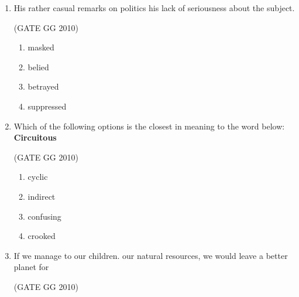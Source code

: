 \documentclass[journal]{IEEEtran}
\begin{document}
\begin{enumerate}[start=26]
\begin{multicols}{4}
\begin{enumerate}
    \item ${E_z=\frac{-1}{i\omega t}\frac{\partial{H_z}}{\partial z}}$
    \vspace{0.3cm}
    \item ${H_x=\frac{-1}{i\omega t}\frac{\partial{E_z}}{\partial z}}$
      \vspace{0.3cm}
    \item ${H_x=\frac{-1}{i\omega t}\frac{\partial{E_x}}{\partial z}}$
      \vspace{0.3cm}
    \item ${H_z=\frac{-1}{i\omega t}\frac{\partial{E_x}}{\partial z}}$\\
    \vspace{0.5cm}
    
\end{enumerate}
\end{multicols}
\textbf{END OF SECTION 2 OF PART B}
\vspace{3cm}

\textbf{General Aptitude (GA) Questions}
\item His rather casual remarks on politics his lack of seriousness about the subject.

\hfill (GATE GG 2010) 

\begin{enumerate}
    \item  masked
\item  belied
\item  betrayed
\item  suppressed
\end{enumerate}

\item Which of the following options is the closest in meaning to the word below:\\
\textbf{Circuitous}

\hfill (GATE GG 2010) 

\begin{enumerate}
    \item cyclic
\item  indirect
\item confusing
\item  crooked
\end{enumerate}

\item  If we manage to our children. our natural resources, we would leave a better planet for

\hfill (GATE GG 2010) 


\end{enumerate}
\end{document}

